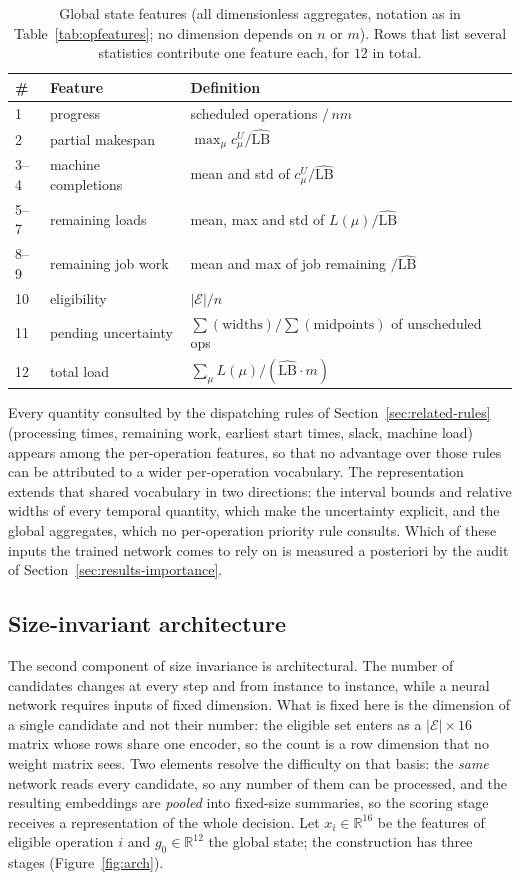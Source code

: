 \documentclass[preprint,12pt]{elsarticle}
\newcommand{\LBi}{\widehat{\mathrm{LB}}}
\theoremstyle{definition}
\theoremstyle{remark}
\begin{document}
\begin{table}[!htb]
\centering\small
\caption{Global state features (all dimensionless aggregates,
notation as in Table~\ref{tab:opfeatures}; no dimension depends on
$n$ or $m$). Rows that list several statistics contribute one feature
each, for $12$ in total.}
\label{tab:globalfeatures}
\begin{tabular*}{\textwidth}{@{\extracolsep{\fill}}lll}
\toprule
\# & Feature & Definition \\
\midrule
1 & progress & scheduled operations $/\,nm$ \\
2 & partial makespan & $\max_\mu c^U_\mu / \LBi$ \\
3--4 & machine completions & mean and std of $c^U_\mu/\LBi$ \\
5--7 & remaining loads & mean, max and std of $L(\mu)/\LBi$ \\
8--9 & remaining job work & mean and max of job remaining $/\LBi$ \\
10 & eligibility & $|\mathcal{E}|/n$ \\
11 & pending uncertainty & $\sum(\text{widths})/\sum(\text{midpoints})$ of
unscheduled ops \\
12 & total load & $\sum_\mu L(\mu)/(\LBi\cdot m)$ \\
\bottomrule
\end{tabular*}
\end{table}

Every quantity consulted by the dispatching rules of
Section~\ref{sec:related-rules} (processing times, remaining work,
earliest start times, slack, machine load) appears among the
per-operation features, so that no advantage over those rules can be
attributed to a wider per-operation vocabulary. The representation
extends that shared vocabulary in two directions: the interval
bounds and relative widths of every temporal quantity, which make the
uncertainty explicit, and the global aggregates, which no
per-operation priority rule consults. Which of these inputs the
trained network comes to rely on is measured a posteriori by the
audit of Section~\ref{sec:results-importance}.

\FloatBarrier
\subsection{Size-invariant architecture}
\label{sec:arch}

The second component of size invariance is architectural. The number
of candidates changes at every step and from instance to instance,
while a neural network requires inputs of fixed dimension. What is
fixed here is the dimension of a single candidate and not their
number: the eligible set enters as a $|\mathcal{E}|\times16$ matrix
whose rows share one encoder, so the count is a row dimension that no
weight matrix sees. Two elements resolve the difficulty on that
basis: the \emph{same} network reads every candidate, so any number
of them can be processed, and the resulting embeddings are
\emph{pooled} into fixed-size summaries, so the scoring stage
receives a representation of the whole decision. Let
$x_i\in\mathbb{R}^{16}$ be the features of eligible operation $i$ and
$g_0\in\mathbb{R}^{12}$ the global state; the construction has
three stages (Figure~\ref{fig:arch}).
\end{document}

